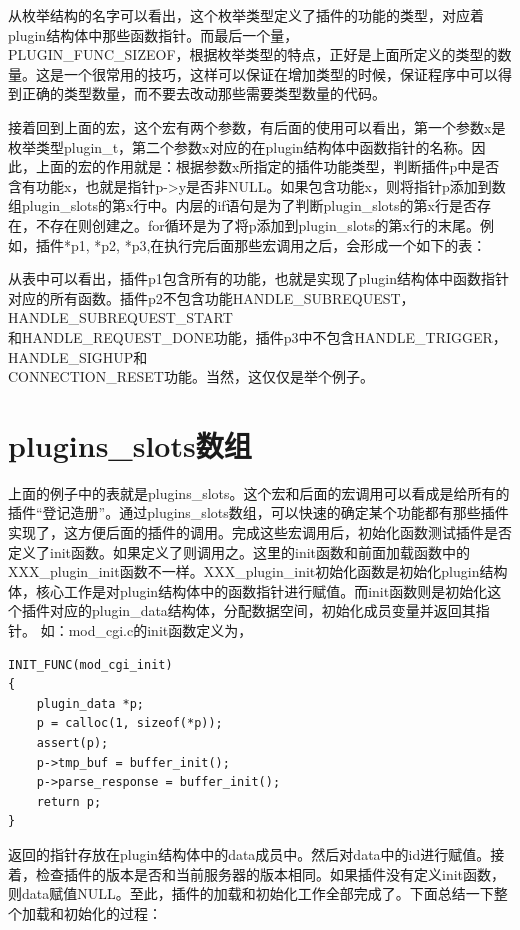 \documentclass[12pt, dvipdfm]{book}
\begin{document}
从枚举结构的名字可以看出，这个枚举类型定义了插件的功能的类型，对应着plugin结构体中那些函数指针。而最后一个量，\\PLUGIN\_FUNC\_SIZEOF，根据枚举类型的特点，正好是上面所定义的类型的数量。这是一个很常用的技巧，这样可以保证在增加类型的时候，保证程序中可以得到正确的类型数量，而不要去改动那些需要类型数量的代码。


接着回到上面的宏，这个宏有两个参数，有后面的使用可以看出，第一个参数x是枚举类型plugin\_t，第二个参数x对应的在plugin结构体中函数指针的名称。因此，上面的宏的作用就是：根据参数x所指定的插件功能类型，判断插件p中是否含有功能x，也就是指针p->y是否非NULL。如果包含功能x，则将指针p添加到数组plugin\_slots的第x行中。内层的if语句是为了判断plugin\_slots的第x行是否存在，不存在则创建之。for循环是为了将p添加到plugin\_slots的第x行的末尾。例如，插件*p1, *p2, *p3,在执行完后面那些宏调用之后，会形成一个如下的表：

从表中可以看出，插件p1包含所有的功能，也就是实现了plugin结构体中函数指针对应的所有函数。插件p2不包含功能HANDLE\_SUBREQUEST，HANDLE\_SUBREQUEST\_START\\和HANDLE\_REQUEST\_DONE功能，插件p3中不包含HANDLE\_TRIGGER，HANDLE\_SIGHUP和\\CONNECTION\_RESET功能。当然，这仅仅是举个例子。

\section{plugins\_slots数组}
上面的例子中的表就是plugins\_slots。这个宏和后面的宏调用可以看成是给所有的插件“登记造册”。通过plugins\_slots数组，可以快速的确定某个功能都有那些插件实现了，这方便后面的插件的调用。完成这些宏调用后，初始化函数测试插件是否定义了init函数。如果定义了则调用之。这里的init函数和前面加载函数中的XXX\_plugin\_init函数不一样。XXX\_plugin\_init初始化函数是初始化plugin结构体，核心工作是对plugin结构体中的函数指针进行赋值。而init函数则是初始化这个插件对应的plugin\_data结构体，分配数据空间，初始化成员变量并返回其指针。
如：mod\_cgi.c的init函数定义为，

\begin{verbatim}
INIT_FUNC(mod_cgi_init)
{
	plugin_data *p;
	p = calloc(1, sizeof(*p));
	assert(p);
	p->tmp_buf = buffer_init();
	p->parse_response = buffer_init();
	return p;
}
\end{verbatim}

返回的指针存放在plugin结构体中的data成员中。然后对data中的id进行赋值。接着，检查插件的版本是否和当前服务器的版本相同。如果插件没有定义init函数，则data赋值NULL。至此，插件的加载和初始化工作全部完成了。下面总结一下整个加载和初始化的过程：
\end{document}
